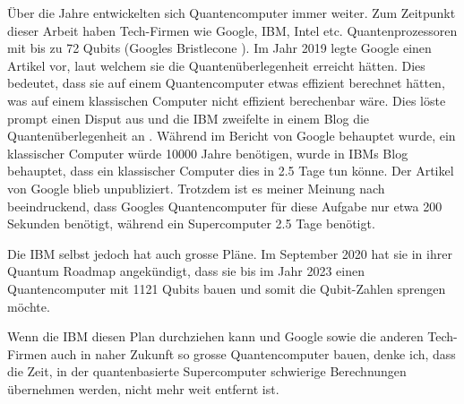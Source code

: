 Über die Jahre entwickelten sich Quantencomputer immer weiter. Zum Zeitpunkt dieser Arbeit haben Tech-Firmen wie Google, IBM, Intel etc. Quantenprozessoren mit bis zu 72 Qubits (Googles Bristlecone \cite{gbc}). Im Jahr 2019 legte Google einen Artikel \cite{GSP} vor, laut welchem sie die Quantenüberlegenheit erreicht hätten. Dies bedeutet, dass sie auf einem Quantencomputer etwas effizient berechnet hätten, was auf einem klassischen Computer nicht effizient berechenbar wäre. Dies löste prompt einen Disput aus und die IBM zweifelte in einem Blog die Quantenüberlegenheit an \cite{IBM}. Während im Bericht von Google behauptet wurde, ein klassischer Computer würde 10000 Jahre benötigen, wurde in IBMs Blog behauptet, dass ein klassischer Computer dies in 2.5 Tage tun könne. Der Artikel von Google blieb unpubliziert. Trotzdem ist es meiner Meinung nach beeindruckend, dass Googles Quantencomputer für diese Aufgabe nur etwa 200 Sekunden benötigt, während ein Supercomputer 2.5 Tage benötigt.

Die IBM selbst jedoch hat auch grosse Pläne. Im September 2020 hat sie in ihrer Quantum Roadmap \cite{IBMrm} angekündigt, dass sie bis im Jahr 2023 einen Quantencomputer mit 1121 Qubits bauen und somit die Qubit-Zahlen sprengen möchte.

Wenn die IBM diesen Plan durchziehen kann und Google sowie die anderen Tech-Firmen auch in naher Zukunft so grosse Quantencomputer bauen, denke ich, dass die Zeit, in der quantenbasierte Supercomputer schwierige Berechnungen übernehmen werden, nicht mehr weit entfernt ist.